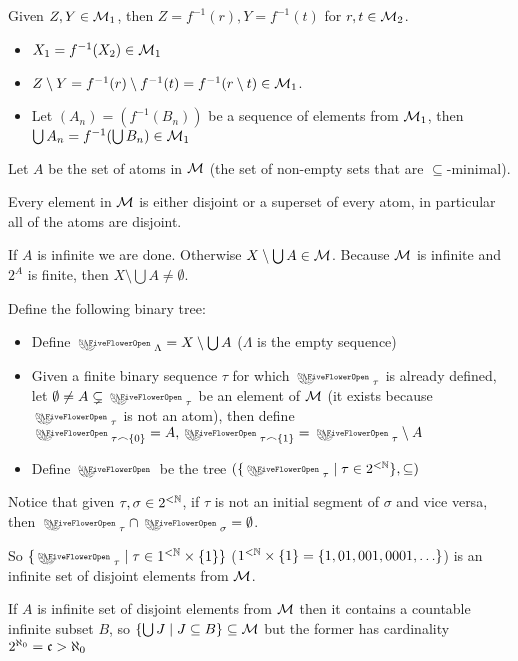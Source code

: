 \begin{cExercise}
	Given $Z,Y\in \cal M_1$, then $Z=f^{-1}(r), Y=f^{-1}(t)$ for $r,t\in\cal M_2$.
	
	\begin{itemize}
		\item $X_1=f^{-1}(X_2)\in \cal M_1$
		\item $Z\setminus Y=f^{-1}(r)\setminus f^{-1}(t)=f^{-1}(r\setminus t)\in\cal M_1$.
		\item Let $(A_n)=(f^{-1}(B_n))$ be a sequence of elements from $\cal M_1$, then $\bigcup A_n=f^{-1}(\bigcup B_n)\in\cal M_1$
	\end{itemize}
\end{cExercise}
\begin{cExercise}
	\begin{cPart}
		Let $A$ be the set of atoms in $\cal M$ (the set of non-empty sets that are $\subseteq$-minimal).
		
		Every element in $\cal M$ is either disjoint or a superset of every atom, in particular all of the atoms are disjoint.
		
		If $A$ is infinite we are done. Otherwise $X\setminus \bigcup A\in \cal M$. Because $\cal M$ is infinite and $2^A$ is finite, then $X\setminus \bigcup A\ne\emptyset$.
		
		Define the following binary tree:
		
		\begin{itemize}
			\item Define $\flower_{\Lambda}=X\setminus \bigcup A$ ($\Lambda$ is the empty sequence)
			\item Given a finite binary sequence $\tau$ for which $\flower_\tau$ is already defined, let $\emptyset\ne A\subsetneq \flower_\tau$ be an element of $\cal M$ (it exists because $\flower_\tau$ is not an atom), then define $\flower_{\tau\frown\{0\}}=A,\flower_{\tau\frown\{1\}}=\flower_\tau\setminus A$
			\item Define $\flower$ be the tree $(\{\flower_\tau\mid \tau\in 2^{<\N}\},\subseteq)$ 
		\end{itemize}
		
		Notice that given $\tau,\sigma\in 2^{<\N}$, if $\tau$ is not an initial segment of $\sigma$ and vice versa, then $\flower_\tau\cap \flower_\sigma=\emptyset$.
		
		So $\{\flower_\tau\mid \tau\in 1^{<\N}\times\{1\}\}$ ($1^{<\N}\times\{1\}=\{1, 01, 001, 0001,\ldots\}$) is an infinite set of disjoint elements from $\cal M$.
	\end{cPart}
	\begin{cPart}
		If $A$ is infinite set of disjoint elements from $\cal M$ then it contains a countable infinite subset $B$, so $\{\bigcup J\mid J\subseteq B\}\subseteq \cal M$ but the former has cardinality $2^{\aleph_0}=\frak c>\aleph_0$
	\end{cPart}
\end{cExercise}






